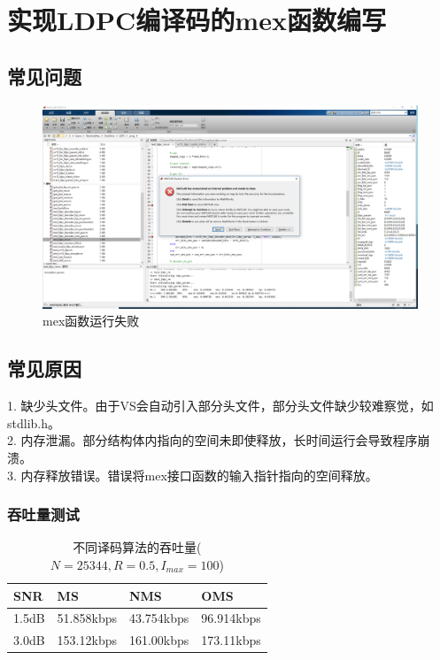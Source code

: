 \documentclass{article}
\begin{document}
\section{实现LDPC编译码的mex函数编写}
\subsection{常见问题}
\begin{figure}[H]
	\centering
	\includegraphics[width = \textwidth]{err.png}
	\caption{mex函数运行失败}
\end{figure}
\subsection{常见原因}
1. 缺少头文件。由于VS会自动引入部分头文件，部分头文件缺少较难察觉，如stdlib.h。\\
2. 内存泄漏。部分结构体内指向的空间未即使释放，长时间运行会导致程序崩溃。\\
3. 内存释放错误。错误将mex接口函数的输入指针指向的空间释放。\\
\subsubsection{吞吐量测试}
\begin{table}[H]
	\caption{不同译码算法的吞吐量($N=25344,R=0.5,I_{max}=100$)}
	\centering
	\begin{tabular}{|l|l|l|l|}%
		\hline  %
		SNR   & MS         & NMS        & OMS        \\
		\hline
		1.5dB & 51.858kbps & 43.754kbps & 96.914kbps \\
		\hline
		3.0dB & 153.12kbps & 161.00kbps & 173.11kbps \\
		\hline  %
	\end{tabular}
\end{table}
\end{document}
